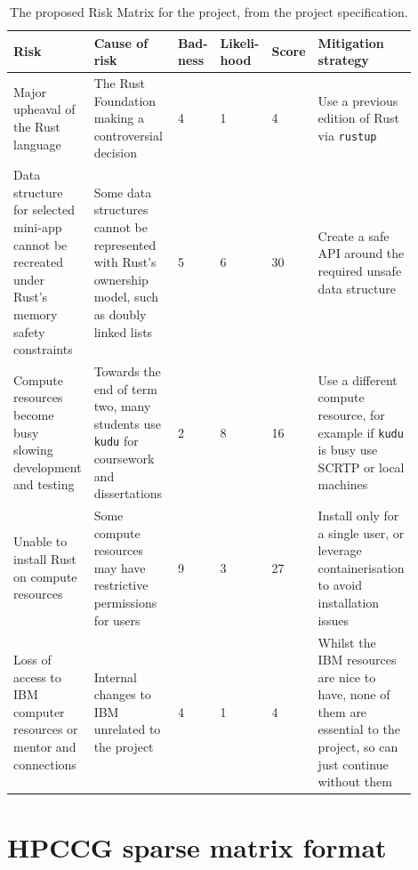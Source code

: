 \begin{table}[H]
\begin{adjustwidth}{-5em}{-3em}
    \centering
    \caption{The proposed Risk Matrix for the project, from the project specification.}
    \label{tab:risk_matrix}
    \begin{tabular}{|p{0.2\linewidth}|p{0.25\linewidth}|p{0.065\linewidth}|p{0.085\linewidth}|p{0.055\linewidth}|p{0.24\linewidth}|} \hline
         \textbf{Risk} & \textbf{Cause of risk} & \textbf{Bad- ness} & \textbf{Likeli- hood} & \textbf{Score} & \textbf{Mitigation strategy}\\ \hline\hline
         Major upheaval of the Rust language&  The Rust Foundation making a controversial decision \cite{AmNoLonger2023} \cite{AddRFCGovernance} \cite{TelemetryGoToolchain}&  4&  1&  \cellcolor{green!25}4 & Use a previous edition of Rust via \texttt{rustup}\\ \hline 
         Data structure for selected \acrshort{mini-app} cannot be recreated under Rust's memory safety
  constraints&  Some data structures cannot be represented with Rust's ownership model, such as doubly linked lists \cite{leeBuildingMemorysafeNetwork2017}&  5&  6&  \cellcolor{red!25}30& Create a safe API around the required unsafe data structure\\ \hline 
         Compute resources become busy slowing development and testing&    Towards the end of term two, many students use \texttt{kudu} for coursework and dissertations&  2&  8&  \cellcolor{orange!25}16& Use a different compute resource, for example if \texttt{kudu} is busy use SCRTP or local machines\\ \hline 
         Unable to install Rust on compute resources&  Some compute resources may have restrictive permissions for users&  9&  3&  \cellcolor{red!25}27& Install only for a single user, or leverage containerisation to avoid installation issues\\ \hline 
 Loss of access to IBM computer resources or mentor and connections& Internal changes to IBM unrelated to the project& 4& 1& \cellcolor{green!25}4 &Whilst the IBM resources are nice to have, none of them are essential to the project, so can just continue without them\\ \hline
    \end{tabular}
    \end{adjustwidth}
\end{table}

\section{HPCCG sparse matrix format}
\label{sec:hpccg-sparse-matrix-appendix}

